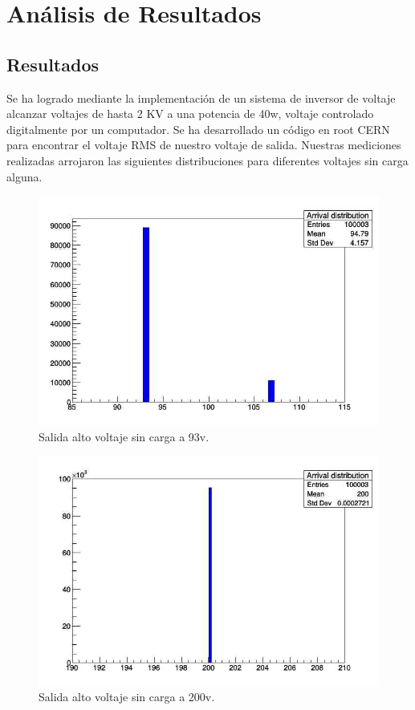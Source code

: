 \chapter{Análisis de Resultados}
\section{Resultados}

Se ha logrado mediante la implementación de un sistema de inversor de voltaje alcanzar voltajes de hasta 2 KV a una potencia de 40w, voltaje controlado digitalmente por un computador. Se ha desarrollado un código en root CERN para encontrar el voltaje RMS de nuestro voltaje de salida. Nuestras mediciones realizadas arrojaron las siguientes distribuciones para diferentes voltajes sin carga alguna. \\

\begin{figure}[H]
\centering
\includegraphics[width=12cm]{Capitulo4/93v.jpg}
\caption{Salida alto voltaje sin carga a 93v.}
\end{figure}

\begin{figure}[H]
\centering
\includegraphics[width=12cm]{Capitulo4/200v.jpg}
\caption{Salida alto voltaje sin carga a 200v.}
\end{figure}

